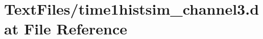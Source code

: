 \hypertarget{TextFiles_2time1histsim__channel3_8dat}{}\section{Text\+Files/time1histsim\+\_\+channel3.dat File Reference}
\label{TextFiles_2time1histsim__channel3_8dat}
